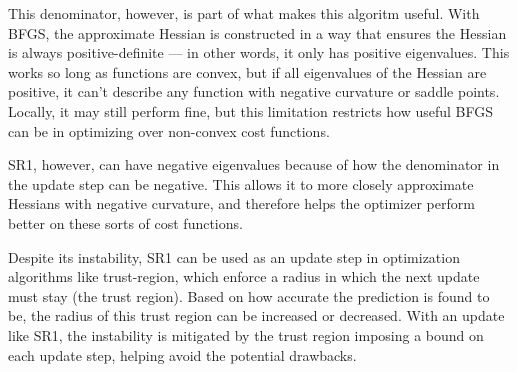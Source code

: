 \documentclass[12pt]{article}
\begin{document}
This denominator, however, is part of what makes this algoritm useful. With BFGS, the approximate Hessian is constructed
in a way that ensures the Hessian is always positive-definite --- in other words, it only has positive eigenvalues. This works
so long as functions are convex, but if all eigenvalues of the Hessian are positive, it can't describe any function
with negative curvature or saddle points. Locally, it may still perform fine, but this limitation restricts how useful
BFGS can be in optimizing over non-convex cost functions.

SR1, however, can have negative eigenvalues because of how the denominator in the update step can be negative. This allows 
it to more closely approximate Hessians with negative curvature, and therefore helps the optimizer perform better on these 
sorts of cost functions.

Despite its instability, SR1 can be used as an update step in optimization algorithms like trust-region, which enforce a 
radius in which the next update must stay (the trust region). Based on how accurate the prediction is found to be, the radius
of this trust region can be increased or decreased. With an update like SR1, the instability is mitigated by the trust region
imposing a bound on each update step, helping avoid the potential drawbacks. 

\nocite{*}
\end{document}

